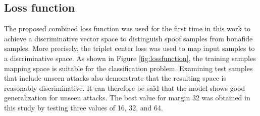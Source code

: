 \documentclass[a4paper]{article}
\begin{document}
\subsection{Loss function}
The proposed combined loss function was used for the first time in this work to achieve a discriminative vector space to distinguish spoof samples from bonafide samples. More precisely, the triplet center loss was used to map input samples to a discriminative space. As shown in Figure \ref{fig:lossfunction}, the training samples mapping space is suitable for the classification problem. Examining test samples that include unseen attacks also demonstrate that the resulting space is reasonably discriminative. It can therefore be said that the model shows good generalization for unseen attacks. The best value for margin 32 was obtained in this study by testing three values of 16, 32, and 64. 
\end{document}
